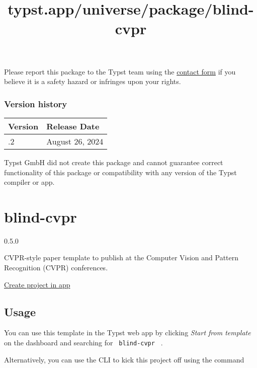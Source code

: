Please report this package to the Typst team using the
\href{https://typst.app/contact}{contact form} if you believe it is a
safety hazard or infringes upon your rights.

\label{versions}
\subsubsection{Version history}\label{version-history}

\begin{longtable}[]{@{}ll@{}}
\toprule\noalign{}
Version & Release Date \\
\midrule\noalign{}
\endhead
\bottomrule\noalign{}
\endlastfoot
1.0.2 & August 26, 2024 \\
\end{longtable}

Typst GmbH did not create this package and cannot guarantee correct
functionality of this package or compatibility with any version of the
Typst compiler or app.


\title{typst.app/universe/package/blind-cvpr}

\label{banner}
\label{template-thumbnail}

\section{blind-cvpr}\label{blind-cvpr}

{ 0.5.0 }

CVPR-style paper template to publish at the Computer Vision and Pattern
Recognition (CVPR) conferences.

\href{/app?template=blind-cvpr&version=0.5.0}{Create project in app}

\label{readme}
\subsection{Usage}\label{usage}

You can use this template in the Typst web app by clicking \emph{Start
from template} on the dashboard and searching for
\texttt{\ blind-cvpr\ } .

Alternatively, you can use the CLI to kick this project off using the
command

\begin{Shaded}
\begin{Highlighting}[]
\end{Highlighting}
\end{Shaded}

